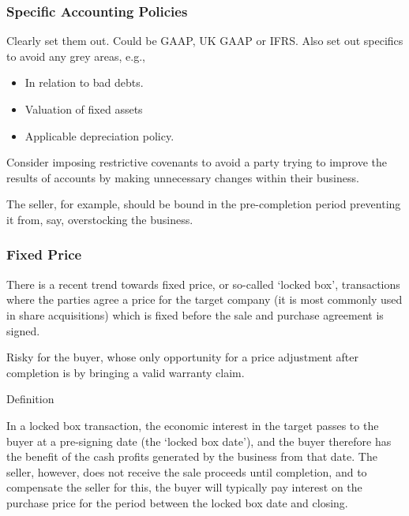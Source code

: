 \documentclass[
]{article}
\providecommand{\tightlist}{%
  \setlength{\itemsep}{0pt}\setlength{\parskip}{0pt}}
\newenvironment{env-3a4a363c-8d41-4783-bfde-af85d2b9ad5f}
{
    \savenotes\tcolorbox[blanker,breakable,left=5pt,borderline west={2pt}{-4pt}{gold}]
}
{
    \endtcolorbox\spewnotes
}
\begin{document}
\hypertarget{specific-accounting-policies}{%
\subsubsection{Specific Accounting
Policies}\label{specific-accounting-policies}}

Clearly set them out. Could be GAAP, UK GAAP or IFRS. Also set out
specifics to avoid any grey areas, e.g.,

\begin{itemize}
\tightlist
\item
  In relation to bad debts.
\item
  Valuation of fixed assets
\item
  Applicable depreciation policy.
\end{itemize}

Consider imposing restrictive covenants to avoid a party trying to
improve the results of accounts by making unnecessary changes within
their business.

The seller, for example, should be bound in the pre-completion period
preventing it from, say, overstocking the business.

\hypertarget{fixed-price}{%
\subsubsection{Fixed Price}\label{fixed-price}}

There is a recent trend towards fixed price, or so-called `locked box',
transactions where the parties agree a price for the target company (it
is most commonly used in share acquisitions) which is fixed before the
sale and purchase agreement is signed.

Risky for the buyer, whose only opportunity for a price adjustment after
completion is by bringing a valid warranty claim.

\begin{env-3a4a363c-8d41-4783-bfde-af85d2b9ad5f}

Definition

In a locked box transaction, the economic interest in the target passes
to the buyer at a pre-signing date (the `locked box date'), and the
buyer therefore has the benefit of the cash profits generated by the
business from that date. The seller, however, does not receive the sale
proceeds until completion, and to compensate the seller for this, the
buyer will typically pay interest on the purchase price for the period
between the locked box date and closing.

\end{env-3a4a363c-8d41-4783-bfde-af85d2b9ad5f}
\end{document}
